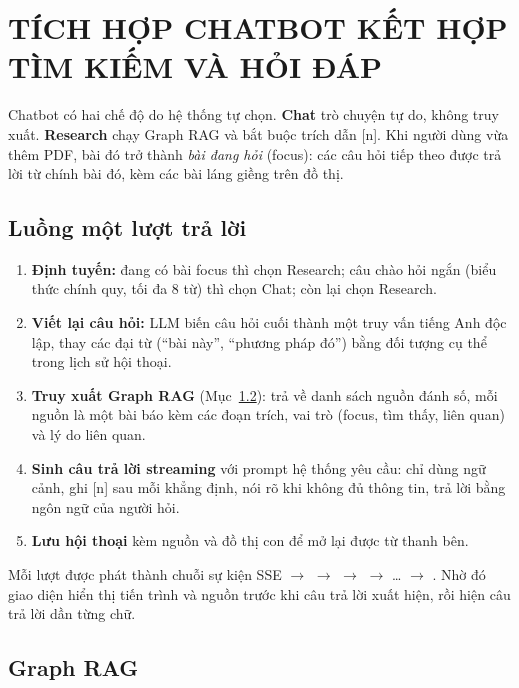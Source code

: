 \chapter{TÍCH HỢP CHATBOT KẾT HỢP TÌM KIẾM VÀ HỎI ĐÁP}\label{chap:chatbot}

Chatbot có hai chế độ do hệ thống tự chọn. \textbf{Chat} trò chuyện tự do, không truy xuất. \textbf{Research} chạy
Graph RAG và bắt buộc trích dẫn [n]. Khi người dùng vừa thêm PDF, bài đó trở thành \emph{bài đang hỏi} (focus):
các câu hỏi tiếp theo được trả lời từ chính bài đó, kèm các bài láng giềng trên đồ thị.

\section{Luồng một lượt trả lời}

\begin{enumerate}[label=(\arabic*)]
\item \textbf{Định tuyến:} đang có bài focus thì chọn Research; câu chào hỏi ngắn (biểu thức chính quy, tối đa
  8 từ) thì chọn Chat; còn lại chọn Research.
\item \textbf{Viết lại câu hỏi:} LLM biến câu hỏi cuối thành một truy vấn tiếng Anh độc lập, thay các đại từ
  (``bài này'', ``phương pháp đó'') bằng đối tượng cụ thể trong lịch sử hội thoại.
\item \textbf{Truy xuất Graph RAG} (Mục~\ref{sec:graphrag}): trả về danh sách nguồn đánh số, mỗi nguồn là một bài
  báo kèm các đoạn trích, vai trò (focus, tìm thấy, liên quan) và lý do liên quan.
\item \textbf{Sinh câu trả lời streaming} với prompt hệ thống yêu cầu: chỉ dùng ngữ cảnh, ghi [n] sau mỗi khẳng
  định, nói rõ khi không đủ thông tin, trả lời bằng ngôn ngữ của người hỏi.
\item \textbf{Lưu hội thoại} kèm nguồn và đồ thị con để mở lại được từ thanh bên.
\end{enumerate}

Mỗi lượt được phát thành chuỗi sự kiện SSE  $\to$  $\to$  $\to$ 
$\to$ \ldots{} $\to$ . Nhờ đó giao diện hiển thị tiến trình và nguồn trước khi câu trả lời
xuất hiện, rồi hiện câu trả lời dần từng chữ.

\section{Graph RAG}\label{sec:graphrag}

